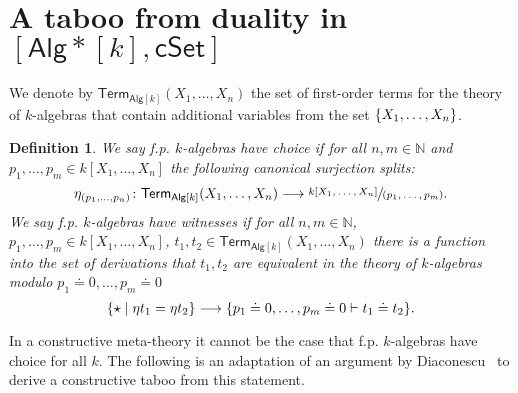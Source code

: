 \documentclass[10pt,a4paper]{article}
\newtheorem{definition}{Definition}[section]
\newcommand{\nats}{\mathbb{N}}
\newcommand{\Set}{\mathsf{Set}}
\newcommand{\cSet}{\mathsf{cSet}}
\newcommand{\Alg}{\mathsf{Alg}}
\DeclarePairedDelimiter\set{\{}{\}}
\newcommand\Term{\mathsf{Term}}
\begin{document}
\section{A taboo from duality in \texorpdfstring{\([\Alg*[k], \cSet]\)}{[k-Algᶠᵖ, cSet]}}\label{sec:k-duality-implies-k-alg-choice}

We denote by \(\Term_{\Alg[k]}(X_1, \ldots, X_n)\) the set of first-order terms for the theory of \(k\)-algebras that contain additional variables from the set \(\set{X_1, \ldots, X_n}\).

\begin{definition}
  We say \emph{f.p. \(k\)-algebras have choice} if for all \(n, m \in \nats\) and \(p_1, \ldots, p_m \in k[X_1, \ldots, X_n]\) the following canonical surjection splits:
  \[
    \eta_{(p_1, \ldots, p_n)} \colon \Term_{\Alg[k]}(X_1, \ldots, X_n) \longrightarrow \sfrac{k[X_1, \ldots, X_n]}{(p_1, \ldots, p_m)}.
  \]
  We say \emph{f.p. \(k\)-algebras have witnesses} if for all \(n, m \in \nats\), \(p_1, \ldots, p_m \in k[X_1, \ldots, X_n]\), \(t_1, t_2 \in \Term_{\Alg[k]}(X_1, \ldots, X_n)\) there is a function into the set of derivations that \(t_1, t_2\) are equivalent in the theory of \(k\)-algebras modulo \(p_1 \doteq 0, \ldots, p_m \doteq 0\)
  \[
    \set{\star \mid \eta t_1 = \eta t_2 } \longrightarrow \set{ p_1 \doteq 0, \ldots, p_m \doteq 0 \vdash t_1 \doteq t_2 }. 
  \]
\end{definition}

In a constructive meta-theory it cannot be the case that f.p. \(k\)-algebras have choice for all \(k\).
The following is an adaptation of an argument by Diaconescu~\cite{diaconescu1975choice} to derive a constructive taboo from this statement.
\end{document}
